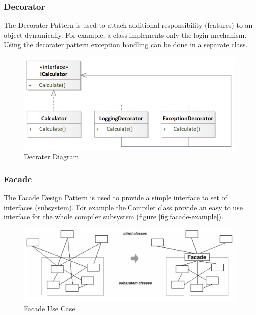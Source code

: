 \documentclass[11pt]{article}
\begin{document}
\subsubsection{Decorator}
\label{sec:orgb6929a1}
The Decorater Pattern is used to attach additional responsibility (features) to an object dynamically.
For example, a class implements only the login mechanism.
Using the decorater pattern exception handling can be done in a separate class.


\begin{figure}[htbp]
\centering
\includegraphics[width=.9\linewidth]{img/decorater.png}
\caption{\label{fig:decrater-diagram}Decrater Diagram}
\end{figure}


\subsubsection{Facade}
\label{sec:org7d96c0a}
The Facade Design Pattern is used to provide a simple interface to set of interfaces (subsystem).
For example the Compiler class provide an easy to use interface for the whole compiler subsystem (figure \ref{fig:facade-example}).


\begin{figure}[htbp]
\centering
\includegraphics[width=.9\linewidth]{img/use_case_facade.png}
\caption{\label{fig:facade-use-case}Facade Use Case}
\end{figure}
\end{document}
